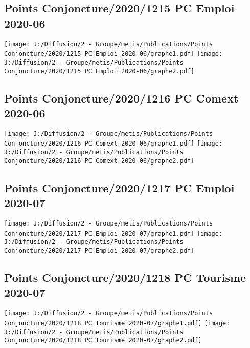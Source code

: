 \documentclass[
]{article}
\begin{document}
\hypertarget{points-conjoncture20201215-pc-emploi-2020-06}{%
\subsection{Points Conjoncture/2020/1215 PC Emploi
2020-06}\label{points-conjoncture20201215-pc-emploi-2020-06}}

\texttt{[image: J:/Diffusion/2 - Groupe/metis/Publications/Points Conjoncture/2020/1215 PC Emploi 2020-06/graphe1.pdf]}
\texttt{[image: J:/Diffusion/2 - Groupe/metis/Publications/Points Conjoncture/2020/1215 PC Emploi 2020-06/graphe2.pdf]}

\hypertarget{points-conjoncture20201216-pc-comext-2020-06}{%
\subsection{Points Conjoncture/2020/1216 PC Comext
2020-06}\label{points-conjoncture20201216-pc-comext-2020-06}}

\texttt{[image: J:/Diffusion/2 - Groupe/metis/Publications/Points Conjoncture/2020/1216 PC Comext 2020-06/graphe1.pdf]}
\texttt{[image: J:/Diffusion/2 - Groupe/metis/Publications/Points Conjoncture/2020/1216 PC Comext 2020-06/graphe2.pdf]}

\hypertarget{points-conjoncture20201217-pc-emploi-2020-07}{%
\subsection{Points Conjoncture/2020/1217 PC Emploi
2020-07}\label{points-conjoncture20201217-pc-emploi-2020-07}}

\texttt{[image: J:/Diffusion/2 - Groupe/metis/Publications/Points Conjoncture/2020/1217 PC Emploi 2020-07/graphe1.pdf]}
\texttt{[image: J:/Diffusion/2 - Groupe/metis/Publications/Points Conjoncture/2020/1217 PC Emploi 2020-07/graphe2.pdf]}

\hypertarget{points-conjoncture20201218-pc-tourisme-2020-07}{%
\subsection{Points Conjoncture/2020/1218 PC Tourisme
2020-07}\label{points-conjoncture20201218-pc-tourisme-2020-07}}

\texttt{[image: J:/Diffusion/2 - Groupe/metis/Publications/Points Conjoncture/2020/1218 PC Tourisme 2020-07/graphe1.pdf]}
\texttt{[image: J:/Diffusion/2 - Groupe/metis/Publications/Points Conjoncture/2020/1218 PC Tourisme 2020-07/graphe2.pdf]}
\end{document}
